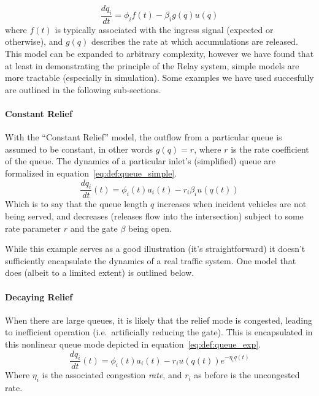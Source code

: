 \documentclass{report}
\begin{document}
\begin{equation}\label{eq:def:accumulator_general}
	\frac{dq_i}{dt} = \phi_i f(t) - \beta_i g(q) u(q)
\end{equation}
where $f(t)$ is typically associated with the ingress signal (expected or otherwise), and $g(q)$ describes the rate at which accumulations are released.
This model can be expanded to arbitrary complexity, however we have found that at least in demonstrating the principle of the Relay system, simple models are more tractable (especially in simulation).
Some examples we have used succesfully are outlined in the following sub-sections.

\paragraph{Constant Relief}
With the ``Constant Relief'' model, the outflow from a particular queue is assumed to be constant, in other words $g(q) = r$, where $r$ is the rate coefficient of the queue.
The dynamics of a particular inlet's (simplified) queue are formalized in equation~\eqref{eq:def:queue_simple}.
\begin{equation}\label{eq:def:queue_simple}
	\frac{dq_i}{dt}(t) = \phi_i(t) a_i(t) - r_i \beta_i u(q(t))
\end{equation}
Which is to say that the queue length $q$ increases when incident vehicles are not being served, and decreases (releases flow into the intersection) subject to some rate parameter $r$ and the gate $\beta$ being open.

While this example serves as a good illustration (it's straightforward) it doesn't sufficiently encapsulate the dynamics of a real traffic system.
One model that does (albeit to a limited extent) is outlined below.

\paragraph{Decaying Relief}
When there are large queues, it is likely that the relief mode is congested, leading to inefficient operation (i.e.\ artificially reducing the gate).
This is encapsulated in this nonlinear queue mode depicted in equation~\eqref{eq:def:queue_exp}.
\begin{equation}\label{eq:def:queue_exp}
	\frac{dq_i}{dt}(t) = \phi_i(t) a_i(t) - r_i u(q(t)) e^{-\eta_i q(t)}
\end{equation}
Where $\eta_i$ is the associated congestion \emph{rate}, and $r_i$ as before is the uncongested rate.
\end{document}
